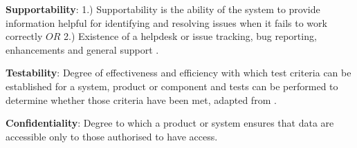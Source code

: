 \textbf{Supportability}: 1.) Supportability is the ability of the system to provide information helpful for identifying and resolving issues when it fails to work correctly \cite{microsoft_2010} $OR$ 2.) Existence of a helpdesk or issue tracking, bug reporting, enhancements and general support \cite{orviz_fernandez_eosc-synergy_2020}.

\textbf{Testability}: Degree of effectiveness and efficiency with which test criteria can be established for a system, product or component and tests can be performed to determine whether those criteria have been met, adapted from \cite{iso_central_secretary_isoiecieee_2010}.

\textbf{Confidentiality}: Degree to which a product or system ensures that data are accessible only to those authorised to have access.

